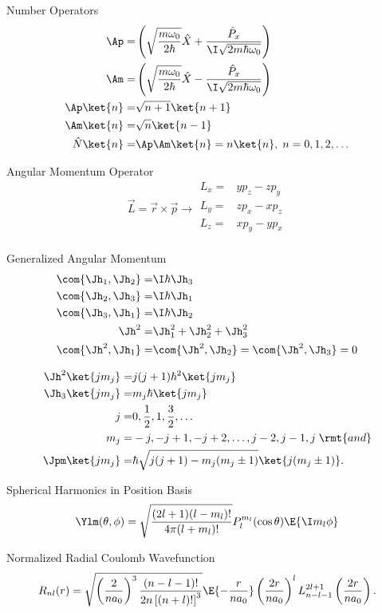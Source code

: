Number Operators
\[
\begin{split}
\Ap = & \left(\sqrt{\frac{m \omega_0}{2\hbar}}\hat{X}+ \frac{\hat{P}_x }{\I\sqrt{2m\hbar\omega_0}}\right)\\
\Am = & \left(\sqrt{\frac{m \omega_0}{2\hbar}}\hat{X}- \frac{\hat{P}_x }{\I\sqrt{2m\hbar\omega_0}}\right)\\
\Ap\ket{n} = & \sqrt{n+1}\ket{n+1}\\
\Am\ket{n} = & \sqrt{n}\ket{n-1}\\
\hat{N}\ket{n} = & \Ap\Am\ket{n} = n\ket{n},\; n=0,1,2,\ldots
\end{split}
\]

Angular Momentum Operator
\[
\vec{L} = \vec{r}\times\vec{p} \rightarrow \begin{aligned}
L_x = & yp_z - zp_y\\
L_y = & zp_x - xp_z\\
L_z = & xp_y - yp_x\\
\end{aligned}
\]

Generalized Angular Momentum
\[
\begin{split}
\com{\Jh_1,\Jh_2} =& \I\hbar\Jh_3\\
\com{\Jh_2,\Jh_3} =& \I\hbar\Jh_1\\
\com{\Jh_3,\Jh_1} =& \I\hbar\Jh_2\\
\Jh^2 = &\Jh_1^2 + \Jh_2^2 +\Jh_3^2\\
\com{\Jh^2,\Jh_1} = & \com{\Jh^2,\Jh_2} = \com{\Jh^2,\Jh_3} = 0
\end{split}
\]

\[
\begin{split}
\Jh^2\ket{jm_j} = & j(j+1)\hbar^2\ket{jm_j}\\
\Jh_3\ket{jm_j} = & m_j\hbar \ket{jm_j} \\
j =& 0,\frac{1}{2},1,\frac{3}{2},\ldots \\ 
m_j =& -j,-j+1,-j+2,\ldots,j-2,j-1,j\; \rmt{ and}\\
\Jpm\ket{jm_j} = &\hbar \sqrt{j(j+1) - m_j(m_j\pm1)} \ket{j(m_j\pm1)}.
\end{split}
\]

Spherical Harmonics in Position Basis
\[
\Ylm(\theta,\phi)=\sqrt{\frac{(2l+1)(l-m_l)!}{4\pi(l+m_l)!}} P_l^{m_l}(\cos\theta) \E{\I m_l\phi}
\]

Normalized Radial Coulomb Wavefunction
\[
R_{nl}(r) = \sqrt{\left(\frac{2}{n a_0}\right)^3\frac{(n-l-1)!}{2n\left[(n+l)!\right]^3}}\E{-\frac{r}{na_0}}\left(\frac{2r}{na_0}\right)^l L_{n-l-1}^{2l+1}\left(\frac{2r}{na_0}\right).
\]

